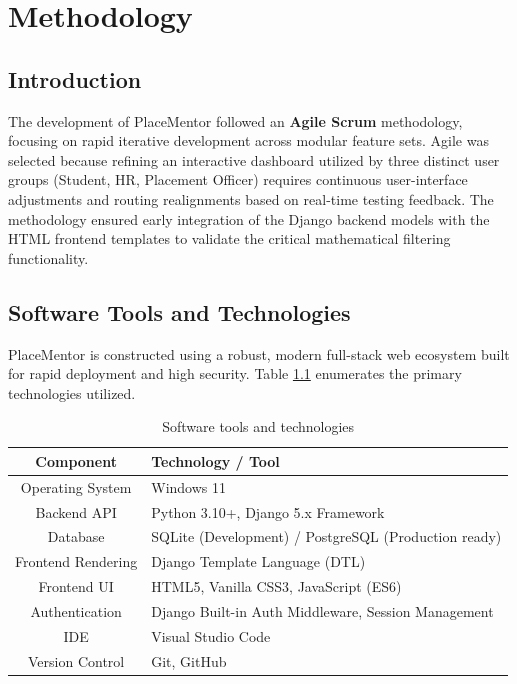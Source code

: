 \documentclass[a4paper,12pt]{report}
\begin{document}
\chapter{Methodology}

\section{Introduction}

The development of PlaceMentor followed an \textbf{Agile Scrum} methodology, focusing on rapid iterative development across modular feature sets. Agile was selected because refining an interactive dashboard utilized by three distinct user groups (Student, HR, Placement Officer) requires continuous user-interface adjustments and routing realignments based on real-time testing feedback. The methodology ensured early integration of the Django backend models with the HTML frontend templates to validate the critical mathematical filtering functionality.

\section{Software Tools and Technologies}

PlaceMentor is constructed using a robust, modern full-stack web ecosystem built for rapid deployment and high security. Table \ref{tab:tools} enumerates the primary technologies utilized.

\begin{table}[H]
\centering
\caption{Software tools and technologies}
\label{tab:tools}
\renewcommand{\arraystretch}{1.3}
\begin{tabular}{|c|>{\centering\arraybackslash}p{9cm}|}
\hline
\textbf{Component} & \textbf{Technology / Tool} \\
\hline
Operating System  & Windows 11 \\
Backend API       & Python 3.10+, Django 5.x Framework \\
Database          & SQLite (Development) / PostgreSQL (Production ready) \\
Frontend Rendering& Django Template Language (DTL) \\
Frontend UI       & HTML5, Vanilla CSS3, JavaScript (ES6) \\
Authentication    & Django Built-in Auth Middleware, Session Management \\
IDE               & Visual Studio Code \\
Version Control   & Git, GitHub \\
\hline
\end{tabular}
\end{table}
\end{document}
